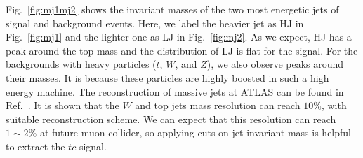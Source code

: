 \documentclass[a4paper,11pt]{article}
\begin{document}
Fig.~\ref{fig:mj1mj2} shows the invariant masses of the two most energetic jets of signal and background events. 
Here, we label the heavier jet as HJ in Fig.~\ref{fig:mj1} and the lighter one as LJ in Fig.~\ref{fig:mj2}.
As we expect, HJ has a peak around the top mass and the distribution of LJ is flat for the signal.
For the backgrounds with heavy particles ($t$, $W$, and $Z$), we also observe peaks around their masses. 
It is because these particles are highly boosted in such a high energy machine. 
The reconstruction of massive jets at ATLAS can be found in Ref.~\cite{ATLAS:2020gwe}.
It is shown that the $W$ and top jets mass resolution can reach $10\%$, 
with suitable reconstruction scheme. 
We can expect that this resolution can reach $1\sim 2\%$ at future muon collider, 
so applying cuts on jet invariant mass is helpful to extract the $tc$ signal.
\end{document}
